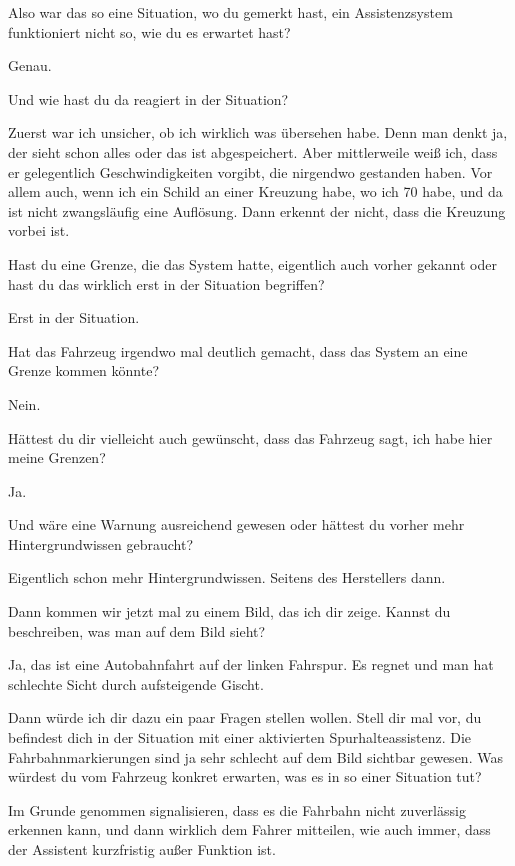 \interviewerin
Also war das so eine Situation, wo du gemerkt hast, ein Assistenzsystem
funktioniert nicht so, wie du es erwartet hast?

Genau.

\interviewerin
Und wie hast du da reagiert in der Situation?

Zuerst war ich unsicher, ob ich wirklich was übersehen habe. Denn man
denkt ja, der sieht schon alles oder das ist abgespeichert. Aber
mittlerweile weiß ich, dass er gelegentlich Geschwindigkeiten vorgibt,
die nirgendwo gestanden haben. Vor allem auch, wenn ich ein Schild an
einer Kreuzung habe, wo ich 70 habe, und da ist nicht zwangsläufig eine
Auflösung. Dann erkennt der nicht, dass die Kreuzung vorbei ist.

\interviewerin
Hast du eine Grenze, die das System hatte, eigentlich auch vorher
gekannt oder hast du das wirklich erst in der Situation begriffen?

Erst in der Situation.

\interviewerin
Hat das Fahrzeug irgendwo mal deutlich gemacht, dass das System an eine
Grenze kommen könnte?

Nein.

\interviewerin
Hättest du dir vielleicht auch gewünscht, dass das Fahrzeug sagt, ich
habe hier meine Grenzen?

Ja.

\interviewerin
Und wäre eine Warnung ausreichend gewesen oder hättest du vorher mehr
Hintergrundwissen gebraucht?

Eigentlich schon mehr Hintergrundwissen. Seitens des Herstellers dann.

\interviewerin
Dann kommen wir jetzt mal zu einem Bild, das ich dir zeige. Kannst du
beschreiben, was man auf dem Bild sieht?

Ja, das ist eine Autobahnfahrt auf der linken Fahrspur. Es regnet und
man hat schlechte Sicht durch aufsteigende Gischt.

\interviewerin
Dann würde ich dir dazu ein paar Fragen stellen wollen. Stell dir mal
vor, du befindest dich in der Situation mit einer aktivierten
Spurhalteassistenz. Die Fahrbahnmarkierungen sind ja sehr schlecht auf
dem Bild sichtbar gewesen. Was würdest du vom Fahrzeug konkret erwarten,
was es in so einer Situation tut?

Im Grunde genommen signalisieren, dass es die Fahrbahn nicht zuverlässig
erkennen kann, und dann wirklich dem Fahrer mitteilen, wie auch immer,
dass der Assistent kurzfristig außer Funktion ist.

